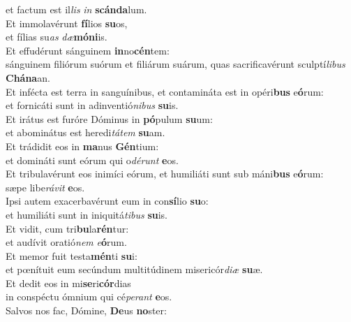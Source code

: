\evenverse et factum est il\textit{lis} \textit{in} \textbf{scán}\textbf{da}lum.\\
\oddverse Et immolavérunt \textbf{fí}lios \textbf{su}os,~\*\\
\oddverse et fílias su\textit{as} \textit{dæ}\textbf{mó}\textbf{ni}is.\\
\evenverse Et effudérunt sánguinem \textbf{in}no\textbf{cén}tem:~\*\\
\evenverse sánguinem filiórum suórum et filiárum suárum, quas sacrificavérunt sculptí\textit{li}\textit{bus} \textbf{Chá}\textbf{na}an.\\
\oddverse Et infécta est terra in sanguínibus, et contamináta est in opéri\textbf{bus} e\textbf{ó}rum:~\*\\
\oddverse et fornicáti sunt in adinventió\textit{ni}\textit{bus} \textbf{su}is.\\
\evenverse Et irátus est furóre Dóminus in \textbf{pó}pulum \textbf{su}um:~\*\\
\evenverse et abominátus est heredi\textit{tá}\textit{tem} \textbf{su}am.\\
\oddverse Et trádidit eos in \textbf{ma}nus \textbf{Gén}tium:~\*\\
\oddverse et domináti sunt eórum qui o\textit{dé}\textit{runt} \textbf{e}os.\\
\evenverse Et tribulavérunt eos inimíci eórum, et humiliáti sunt sub máni\textbf{bus} e\textbf{ó}rum:~\*\\
\evenverse sæpe libe\textit{rá}\textit{vit} \textbf{e}os.\\
\oddverse Ipsi autem exacerbavérunt eum in con\textbf{sí}lio \textbf{su}o:~\*\\
\oddverse et humiliáti sunt in iniquitá\textit{ti}\textit{bus} \textbf{su}is.\\
\evenverse Et vidit, cum tri\textbf{bu}la\textbf{rén}tur:~\*\\
\evenverse et audívit oratió\textit{nem} \textit{e}\textbf{ó}rum.\\
\oddverse Et memor fuit testa\textbf{mén}ti \textbf{su}i:~\*\\
\oddverse et pœnítuit eum secúndum multitúdinem misericór\textit{di}\textit{æ} \textbf{su}æ.\\
\evenverse Et dedit eos in mi\textbf{se}ri\textbf{cór}dias~\*\\
\evenverse in conspéctu ómnium qui cé\textit{pe}\textit{rant} \textbf{e}os.\\
\oddverse Salvos nos fac, Dómine, \textbf{De}us \textbf{no}ster:~\*\\
